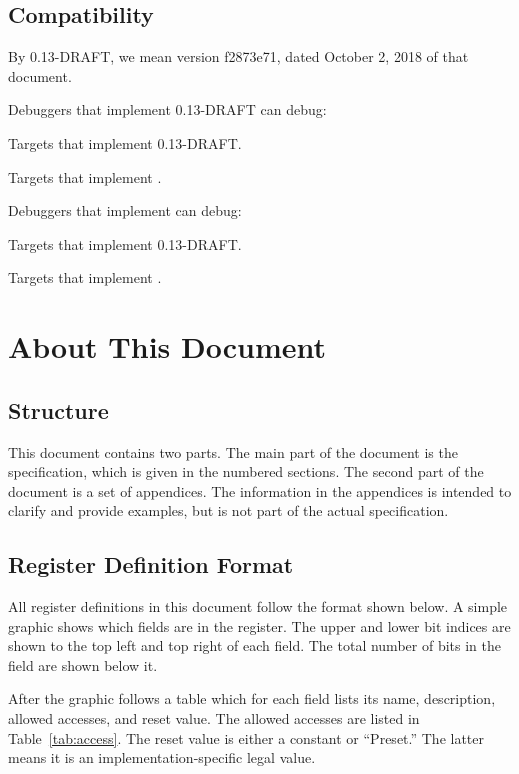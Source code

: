 \subsection{Compatibility}

By 0.13-DRAFT, we mean version f2873e71, dated October 2, 2018 of that document.

\begin{steps}{Debuggers that implement 0.13-DRAFT can debug:}
    \item Targets that implement 0.13-DRAFT.
    \item Targets that implement \versionnum.
\end{steps}

\begin{steps}{Debuggers that implement \versionnum{} can debug:}
    \item Targets that implement 0.13-DRAFT.
    \item Targets that implement \versionnum.
\end{steps}

\section{About This Document}

\subsection{Structure}

This document contains two parts. The main part of the document is the
specification, which is given in the numbered sections. The second part
of the document is a set of  appendices. The information
in the appendices is intended to clarify and provide examples, but is
not part of the actual specification.

\subsection{Register Definition Format}

All register definitions in this document follow the format shown below.  A
simple graphic shows which fields are in the register. The upper and lower bit
indices are shown to the top left and top right of each field. The total number
of bits in the field are shown below it.

After the graphic follows a table which for each field lists its name,
description, allowed accesses, and reset value. The allowed accesses are listed
in Table~\ref{tab:access}. The reset value is either a constant or ``Preset.''
The latter means it is an implementation-specific legal value.

